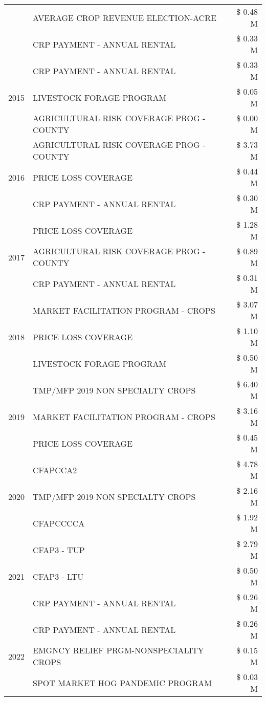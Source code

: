 \begin{tabular}{llr}
 & AVERAGE CROP REVENUE ELECTION-ACRE & \$ 0.48 M \\
 & CRP PAYMENT - ANNUAL RENTAL & \$ 0.33 M \\
\cline{1-3}
\multirow[t]{3}{*}{2015} & CRP PAYMENT - ANNUAL RENTAL & \$ 0.33 M \\
 & LIVESTOCK FORAGE PROGRAM & \$ 0.05 M \\
 & AGRICULTURAL RISK COVERAGE PROG - COUNTY & \$ 0.00 M \\
\cline{1-3}
\multirow[t]{3}{*}{2016} & AGRICULTURAL RISK COVERAGE PROG - COUNTY & \$ 3.73 M \\
 & PRICE LOSS COVERAGE & \$ 0.44 M \\
 & CRP PAYMENT - ANNUAL RENTAL & \$ 0.30 M \\
\cline{1-3}
\multirow[t]{3}{*}{2017} & PRICE LOSS COVERAGE & \$ 1.28 M \\
 & AGRICULTURAL RISK COVERAGE PROG - COUNTY & \$ 0.89 M \\
 & CRP PAYMENT - ANNUAL RENTAL & \$ 0.31 M \\
\cline{1-3}
\multirow[t]{3}{*}{2018} & MARKET FACILITATION PROGRAM - CROPS & \$ 3.07 M \\
 & PRICE LOSS COVERAGE & \$ 1.10 M \\
 & LIVESTOCK FORAGE PROGRAM & \$ 0.50 M \\
\cline{1-3}
\multirow[t]{3}{*}{2019} & TMP/MFP 2019 NON SPECIALTY CROPS & \$ 6.40 M \\
 & MARKET FACILITATION PROGRAM - CROPS & \$ 3.16 M \\
 & PRICE LOSS COVERAGE & \$ 0.45 M \\
\cline{1-3}
\multirow[t]{3}{*}{2020} & CFAPCCA2 & \$ 4.78 M \\
 & TMP/MFP 2019 NON SPECIALTY CROPS & \$ 2.16 M \\
 & CFAPCCCCA & \$ 1.92 M \\
\cline{1-3}
\multirow[t]{3}{*}{2021} & CFAP3 - TUP & \$ 2.79 M \\
 & CFAP3 - LTU & \$ 0.50 M \\
 & CRP PAYMENT - ANNUAL RENTAL & \$ 0.26 M \\
\cline{1-3}
\multirow[t]{3}{*}{2022} & CRP PAYMENT - ANNUAL RENTAL & \$ 0.26 M \\
 & EMGNCY RELIEF PRGM-NONSPECIALITY CROPS & \$ 0.15 M \\
 & SPOT MARKET HOG PANDEMIC PROGRAM & \$ 0.03 M \\
\cline{1-3}
\bottomrule
\end{tabular}
